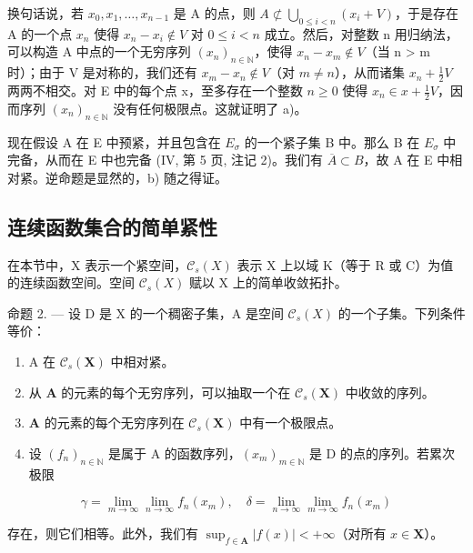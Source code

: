 换句话说，若 \(x_{0}, x_{1}, \ldots, x_{n-1}\) 是 A 的点，则 \(A \not\subset \bigcup_{0 \leqslant i < n} (x_{i} + V)\)，于是存在 A 的一个点 \(x_{n}\) 使得 \(x_{n} - x_{i} \notin V\) 对 \(0 \leqslant i < n\) 成立。然后，对整数 n 用归纳法，可以构造 A 中点的一个无穷序列 \((x_{n})_{n \in \mathbb{N}}\)，使得 \(x_{n} - x_{m} \notin V\)（当 n \textgreater{} m 时）；由于 V 是对称的，我们还有 \(x_{m} - x_{n} \notin V\)（对 \(m \neq n\)），从而诸集 \(x_{n} + \frac{1}{2}V\) 两两不相交。对 E 中的每个点 x，至多存在一个整数 \(n \geqslant 0\) 使得 \(x_{n} \in x + \frac{1}{2}V\)，因而序列 \((x_{n})_{n \in \mathbb{N}}\) 没有任何极限点。这就证明了 a)。

现在假设 A 在 E 中预紧，并且包含在 \(E_{\sigma}\) 的一个紧子集 B 中。那么 B 在 \(E_{\sigma}\) 中完备，从而在 E 中也完备 (IV, 第 5 页, 注记 2)。我们有 \(\overline{A} \subset B\)，故 A 在 E 中相对紧。逆命题是显然的，b) 随之得证。

\subsection{连续函数集合的简单紧性}

在本节中，X 表示一个紧空间，\(\mathcal{C}_{s}(X)\) 表示 X 上以域 K（等于 R 或 C）为值的连续函数空间。空间 \(\mathcal{C}_{s}(X)\) 赋以 X 上的简单收敛拓扑。

命题 2. --- 设 D 是 X 的一个稠密子集，A 是空间 \(\mathcal{C}_{s}(X)\) 的一个子集。下列条件等价：

\begin{enumerate}
\def\labelenumi{(\roman{enumi})}
\item
  A 在 \(\mathcal{C}_s(\mathbf{X})\) 中相对紧。
\item
  从 \(\mathbf{A}\) 的元素的每个无穷序列，可以抽取一个在 \(\mathcal{C}_s(\mathbf{X})\) 中收敛的序列。
\item
  \(\mathbf{A}\) 的元素的每个无穷序列在 \(\mathcal{C}_s(\mathbf{X})\) 中有一个极限点。
\item
  设 \((f_n)_{n\in \mathbb{N}}\) 是属于 A 的函数序列，\((x_m)_{m\in \mathbb{N}}\) 是 D 的点的序列。若累次极限
\end{enumerate}

\[
\gamma = \lim _ {m \rightarrow \infty} \lim _ {n \rightarrow \infty} f _ {n} (x _ {m}), \quad \delta = \lim _ {n \rightarrow \infty} \lim _ {m \rightarrow \infty} f _ {n} (x _ {m})
\]

存在，则它们相等。此外，我们有 \(\sup_{f\in \mathbf{A}}|f(x)| < +\infty\)（对所有 \(x\in \mathbf{X}\)）。


